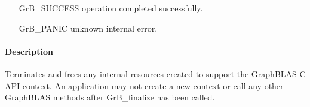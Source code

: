 \begin{itemize}[leftmargin=2.1in]
\item[{\sf GrB\_SUCCESS}]        operation completed successfully.
\item[{\sf GrB\_PANIC}]          unknown internal error.
\end{itemize}

\paragraph{Description}

Terminates and frees any internal resources created to support the
GraphBLAS C API context.  An application may not create a new context
or call any other GraphBLAS methods after {\sf GrB\_finalize} has been called.
